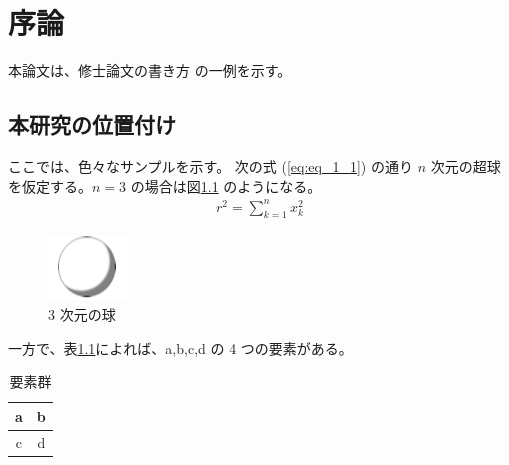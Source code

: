 \chapter{序論}

本論文は、修士論文の書き方 \cite{taro} の一例を示す。


\section{本研究の位置付け}

ここでは、色々なサンプルを示す。
次の式 (\ref{eq:eq_1_1}) の通り $n$ 次元の超球を仮定する。$n = 3$ の場合は図\ref{fig:ball 1} のようになる。
\begin{align}
	r^2 = \sum_{k=1}^n x_k^2
	\label{eq:eq_1_1}
\end{align}
\begin{figure}[h]
	\centering
	\includegraphics[bb=0 0 79 65]{./figures/ball.png}
	\caption{3 次元の球}
	\label{fig:ball 1}
\end{figure}

一方で、表\ref{table:elem 1}によれば、a,b,c,d の 4 つの要素がある。
\begin{table}[h]
	\centering
	\renewcommand{\tablename}{表}
	\begin{tabular}{|c|c|}
		\hline
		a & b \\ \hline
		c & d \\ \hline
	\end{tabular}
	\caption{要素群}
	\label{table:elem 1}
\end{table}

